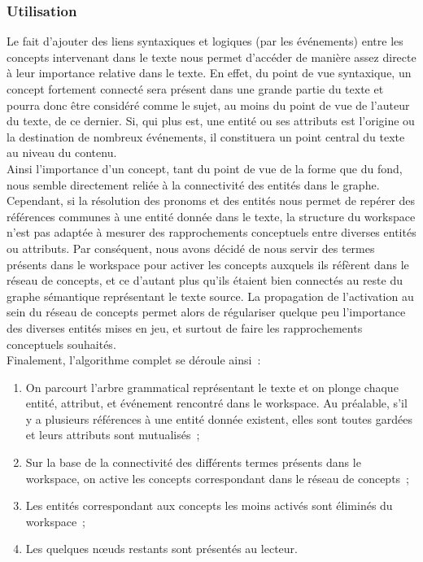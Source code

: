 \documentclass[a4paper, 12pt]{article}
\begin{document}
\subsubsection{Utilisation}

Le fait d'ajouter des liens syntaxiques et logiques (par les événements) entre les concepts intervenant dans le texte nous permet d'accéder de manière assez directe à leur importance relative dans le texte. En effet, du point de vue syntaxique, un concept fortement connecté sera présent dans une grande partie du texte et pourra donc être considéré comme le sujet, au moins du point de vue de l'auteur du texte, de ce dernier. Si, qui plus est, une entité ou ses attributs est l'origine ou la destination de nombreux événements, il constituera un point central du texte au niveau du contenu.\\

Ainsi l'importance d'un concept, tant du point de vue de la forme que du fond, nous semble directement reliée à la connectivité des entités dans le graphe. Cependant, si la résolution des pronoms et des entités nous permet de repérer des références communes à une entité donnée dans le texte, la structure du workspace n'est pas adaptée à mesurer des rapprochements conceptuels entre diverses entités ou attributs. Par conséquent, nous avons décidé de nous servir des termes présents dans le workspace pour activer les concepts auxquels ils réfèrent dans le réseau de concepts, et ce d'autant plus qu'ils étaient bien connectés au reste du graphe sémantique représentant le texte source. La propagation de l'activation au sein du réseau de concepts permet alors de régulariser quelque peu l'importance des diverses entités mises en jeu, et surtout de faire les rapprochements conceptuels souhaités.\\

Finalement, l'algorithme complet se déroule ainsi~:

\begin{enumerate}
	\item On parcourt l'arbre grammatical représentant le texte et on plonge chaque entité, attribut, et événement rencontré dans le workspace. Au préalable, s'il y a plusieurs références à une entité donnée existent, elles sont toutes gardées et leurs attributs sont mutualisés~;
	\item Sur la base de la connectivité des différents termes présents dans le workspace, on active les concepts correspondant dans le réseau de concepts~;
	\item Les entités correspondant aux concepts les moins activés sont éliminés du workspace~;
	\item Les quelques nœuds restants sont présentés au lecteur.
\end{enumerate}
\end{document}
